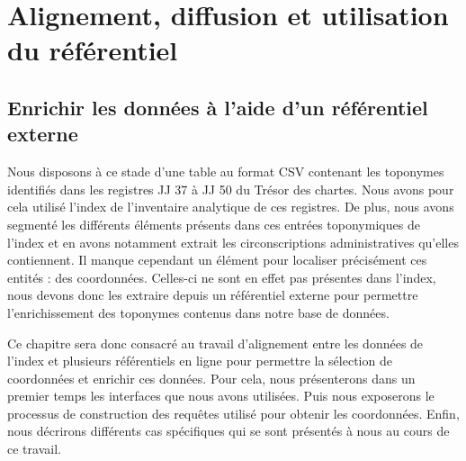 \documentclass[a4paper,12pt,twoside]{book}
\makeatletter
\newcommand{\parttext}[1]{\def\@parttext{#1}}
\makeatother
\begin{document}
	\parttext{Si la constitution d'un référentiel à partir d'entrées d'index constitue l'objectif premier du stage, ce travail n'est pas suffisant pour fournir un outil pertinent afin d'étudier le contenu du Trésor des chartes. Les données constituées, pour être utiles, doivent en effet pouvoir rejoindre et compléter les différentes ontologies web déjà disponibles. Nous consacrerons donc cette troisième et dernière partie à la création de liens à partir du référentiel et à ses utilisations. L'objectif étant de l'insérer dans les connaissances générales disponibles sur les documents historiques. Pour cela, nous décrirons dans un premier chapitre le processus d'enrichissement du référentiel par son alignement avec des ontologies web. Puis nous dédierons un second chapitre à la mise à disposition du référentiel et aux liens réalisés avec les autres données du corpus. Enfin, nous consacrerons un troisième chapitre aux différents essais réalisés pour la mise en œuvre du liage d'entités.}
	
	\part{Alignement, diffusion et utilisation du référentiel}
	
	\chapter{Enrichir les données à l’aide d’un référentiel externe}
	
	Nous disposons à ce stade d'une table au format CSV contenant les toponymes identifiés dans les registres JJ 37 à JJ 50 du Trésor des chartes. Nous avons pour cela utilisé l'index de l'inventaire analytique de ces registres. De plus, nous avons segmenté les différents éléments présents dans ces entrées toponymiques de l'index et en avons notamment extrait les circonscriptions administratives qu'elles contiennent. Il manque cependant un élément pour localiser précisément ces entités : des coordonnées. Celles-ci ne sont en effet pas présentes dans l'index, nous devons donc les extraire depuis un référentiel externe pour permettre l'enrichissement des toponymes contenus dans notre base de données.
	
	Ce chapitre sera donc consacré au travail d'alignement entre les données de l'index et plusieurs référentiels en ligne pour permettre la sélection de coordonnées et enrichir ces données. Pour cela, nous présenterons dans un premier temps les interfaces que nous avons utilisées. Puis nous exposerons le processus de construction des requêtes utilisé pour obtenir les coordonnées. Enfin, nous décrirons différents cas spécifiques qui se sont présentés à nous au cours de ce travail.
	
\end{document}
